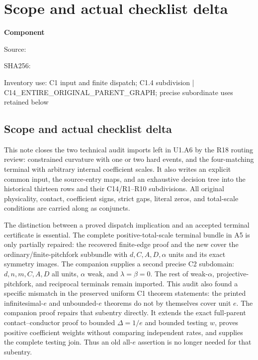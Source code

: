 \chapter{Scope and actual checklist delta}
\label{component:p0be1d6088cc6}
\noindent\textbf{Component }\par
{\small\noindent Source: \par}
{\small\noindent SHA256: \par}
{\small\noindent Inventory use: C1 input and finite dispatch; C1.4 subdivision | C14\_\allowbreak{}ENTIRE\_\allowbreak{}ORIGINAL\_\allowbreak{}PARENT\_\allowbreak{}GRAPH; precise subordinate uses retained below\par}
\medskip
\section*{Scope and actual checklist delta}

This note closes the two technical audit imports left in U1.A6 by the
R18 routing review: constrained curvature with one or two hard events,
and the four-matching terminal with arbitrary internal coefficient
scales. It also writes an explicit common input, the source-entry maps,
and an exhaustive decision tree into the historical thirteen rows and
their C14/R1--R10 subdivisions. All original physicality, contact,
coefficient signs, strict gaps, literal zeros, and total-scale conditions
are carried along as conjuncts.

The distinction between a proved dispatch implication and an accepted
terminal certificate is essential. The complete positive-total-scale
terminal bundle in A5 is only partially repaired: the recovered finite-edge
proof and the new  cover the
ordinary/finite-pitchfork subbundle with $d,C,A,D,\alpha$ units and its
exact symmetry images. The companion
 supplies a second precise
C2 subdomain: $d,n,m,C,A,D$ all units, $\alpha$ weak, and
$\lambda=\beta=0$. The rest of weak-$\alpha$, projective-pitchfork,
and reciprocal terminals remain imported. This audit also
found a specific mismatch in the preserved uniform C1 theorem statements:
the printed infinitesimal-$e$ and unbounded-$e$ theorems do not by
themselves cover unit $e$. The companion proof
 repairs that subentry directly.
It extends the exact full-parent contact--conductor proof to bounded
$\Delta=1/e$ and bounded testing $w$, proves positive coefficient weights
without comparing independent rates, and supplies the complete testing
join. Thus an old all-$e$ assertion is no longer needed for that subentry.

